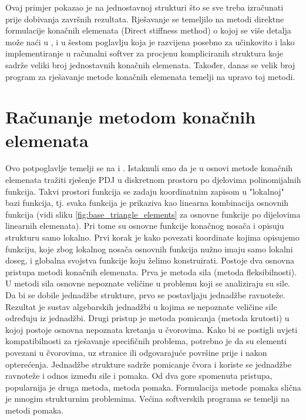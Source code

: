 \documentclass[a4paper,twoside,12pt]{memoir} %
\begin{document}
Ovaj primjer pokazao je na jednostavnoj strukturi što se sve treba izračunati prije dobivanja završnih rezultata. Rješavanje se temeljilo na metodi direktne formulacije konačnih elemenata (Direct stiffness method) o kojoj se više detalja može naći u \cite{direct_stiffness_method_article}, \cite{direct_stiffness_method} i u šestom poglavlju \cite{jurica_soric} koja je razvijena posebno za učinkovito i lako implementiranje u računalni softver za procjenu kompliciranih struktura koje sadrže veliki broj jednostavnih konačnih elemenata. Također, danas se velik broj program za rješavanje metode konačnih elemenata temelji na upravo toj metodi.

\section{Računanje metodom konačnih elemenata}
Ovo potpoglavlje temelji se na \cite{jurica_soric} i \cite{fem_predavanja_bosna}.
Istaknuli smo da je u osnovi metode konačnih elemenata tražiti rješenje PDJ u diskretnom prostoru po djelovima polinomijalnih funkcija. Takvi prostori funkcija se zadaju koordinatnim zapisom u "lokalnoj" bazi funkcija, tj. svaka funkcija je prikaziva kao linearna kombinacija osnovnih funkcija (vidi sliku \ref{fig:base_triangle_elements} za osnovne funkcije po dijelovima linearnih elemenata). Pri tome su osnovne funkcije konačnog nosača i opisuju strukturu samo lokalno. Prvi korak je kako povezati koordinate kojima opisujemo funkciju, koje zbog lokalnog nosača osnovnih funkcija nužno imaju samo lokalni doseg, i globalna svojstva funkcije koju želimo konstruirati. Postoje dva osnovna pristupa metodi konačnih elemenata. 
Prva je metoda sila (metoda fleksibilnosti). U metodi sila osnovne nepoznate veličine u problemu koji se analiziraju su sile. Da bi se dobile jednadžbe strukture, prvo se postavljaju jednadžbe ravnoteže. Rezultat je sustav algebarskih jednadžbi u kojima se nepoznate veličine sile određuju iz jednadžbi.
Drugi pristup je metoda pomicanja (metoda krutosti) u kojoj postoje osnovna nepoznata kretanja u čvorovima. Kako bi se postigli uvjeti kompatibilnosti za rješavanje specifičnih problema, potrebno je da su elementi povezani u čvorovima, uz stranice ili odgovarajuće površine prije i nakon opterećenja. Jednadžbe strukture sadrže pomicanje čvora i koriste se jednadžbe ravnoteže i odnos između sile i pomaka. 
Od dva gore spomenuta pristupa, popularnija je druga metoda, metoda pomaka. Formulacija metode pomaka slična je mnogim strukturnim problemima. Većina softverskih programa se temelji na metodi pomaka. \par
\end{document}
